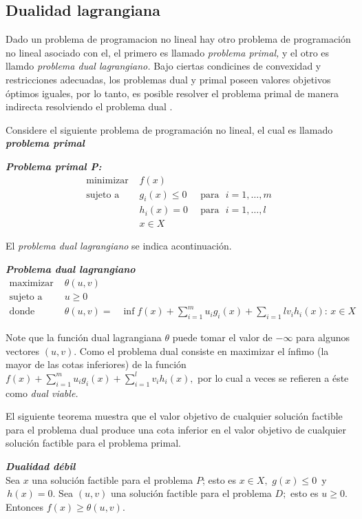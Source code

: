 \subsection{Dualidad lagrangiana}


Dado un problema de programacion no lineal hay otro problema de programaci\'on no lineal asociado con el, el primero es llamado {\it problema 
primal,} y el otro es llamdo {\it problema dual lagrangiano.} Bajo ciertas condicines de convexidad y restricciones adecuadas, los 
problemas dual y primal poseen valores objetivos \'optimos iguales, por lo tanto, es posible resolver el problema primal de manera indirecta
resolviendo el problema dual \cite{no-lineal}.\\ \medskip

Considere el siguiente problema de programaci\'on no lineal, el cual es llamado \textbf{\it problema primal}
\medskip

\textbf{\itshape Problema primal P:}
\begin{eqnarray*}
   \mbox{minimizar  } & f(x) & \,\, \\
   \mbox{sujeto a  } & g_i(x) \leqslant 0 & \, \mbox{ para }\,\, i=1, \ldots , m\\
   &  h_i(x) =  0 &\, \mbox{ para }\,\, i=1, \ldots , l\\
   & x \in  X & \,\,
\end{eqnarray*}
\medskip

El {\it problema dual lagrangiano} se indica acontinuaci\'on.\medskip

\textbf{\itshape Problema dual lagrangiano}
\begin{eqnarray*}
   \mbox{maximizar  } & \theta(u, v) & \,\, \\
   \mbox{sujeto a  } & u \geqslant 0 & \,\, \\
   \mbox{donde  } &  \theta(u, v)  = & \inf {f(x) + \sum_{i=1}^{m}u_i g_i(x) + \sum_{i = 1}{l} v_i h_i(x):\, x \in X}
\end{eqnarray*}

Note que la funci\'on dual lagrangiana $\theta$ puede tomar el valor de $- \infty$ para algunos vectores $(u, v).$ Como el problema dual 
consiste en maximizar el \'infimo (la mayor de las cotas inferiores) de la funci\'on  $ f(x) + \displaystyle{\sum_{i=1}^{m}u_ig_i(x) + 
\sum_{i=1}^{l}v_ih_i(x)},$ por lo cual a veces se refieren a \'este como {\it dual viable.}
\medskip

El siguiente teorema muestra que el valor objetivo de cualquier soluci\'on factible para el problema dual produce una cota inferior en el 
valor objetivo de cualquier soluci\'on factible para el problema primal.

{\teorema \textbf{\itshape Dualidad d\'ebil}\\
Sea $x$ una soluci\'on factible para el problema $P$; esto es $x \in X,\,\, g(x) \leqslant 0\,$ y $\, h(x) = 0. $ Sea $(u, v)$ una soluci\'on
factible para el problema $D; $ esto es $ u \geqslant 0. $ Entonces $f(x) \geqslant \theta(u, v).$}









